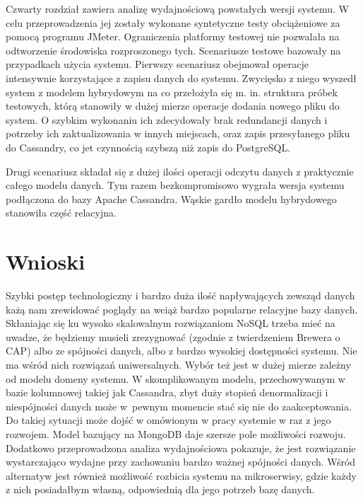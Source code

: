 Czwarty rozdział zawiera analizę wydajnościową powstałych wersji systemu.
W celu przeprowadzenia jej zostały wykonane syntetyczne testy obciążeniowe za pomocą programu JMeter.
Ograniczenia platformy testowej nie pozwalała na odtworzenie środowiska rozproszonego tych.
Scenariusze testowe bazowały na przypadkach użycia systemu.
Pierwszy scenariusz obejmował operacje intensywnie korzystające z zapisu danych do systemu.
Zwycięsko z niego wyszedł system z modelem hybrydowym na co przełożyła się m. in. struktura próbek testowych, którą stanowiły w dużej mierze operacje dodania nowego pliku do system.
O szybkim wykonaniu ich zdecydowały brak redundancji danych i potrzeby ich zaktualizowania w innych miejscach, oraz zapis przesyłanego pliku do Cassandry, co jet czynnością szybszą niż zapis do PostgreSQL.

Drugi scenariusz składał się z dużej ilości operacji odczytu danych z praktycznie całego modelu danych.
Tym razem bezkompromisowo wygrała wersja systemu podłączona do bazy Apache Cassandra.
Wąskie gardło modelu hybrydowego stanowiła część relacyjna.

\section*{Wnioski}

Szybki postęp technologiczny i bardzo duża ilość napływających zewsząd danych każą nam zrewidować poglądy na wciąż bardzo popularne relacyjne bazy danych.
Skłaniając się ku wysoko skalowalnym rozwiązaniom NoSQL trzeba mieć na uwadze, że będziemy musieli zrezygnować (zgodnie z twierdzeniem Brewera o CAP) albo ze spójności danych, albo z bardzo wysokiej dostępności systemu.
Nie ma wśród nich rozwiązań uniwersalnych.
Wybór też jest w dużej mierze zależny od modelu domeny systemu. 
W skomplikowanym modelu, przechowywanym w bazie kolumnowej takiej jak Cassandra, zbyt duży stopień denormalizacji i niespójności danych może w~pewnym momencie stać się nie do zaakceptowania.
Do takiej sytuacji może dojść w omówionym w pracy systemie w raz z jego rozwojem.
Model bazujący na MongoDB daje szersze pole możliwości rozwoju.
Dodatkowo przeprowadzona analiza wydajnościowa pokazuje, że jest rozwiązanie wystarczająco wydajne przy zachowaniu bardzo ważnej spójności danych.
Wśród alternatyw jest również możliwość rozbicia systemu na mikroserwisy, gdzie każdy z nich posiadałbym własną, odpowiednią dla jego potrzeb bazę danych.
